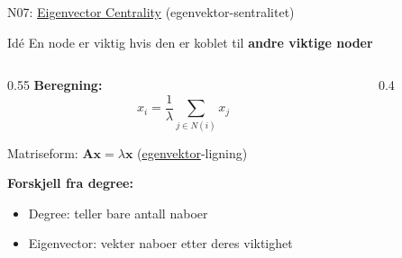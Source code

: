 \documentclass[aspectratio=169, 10pt]{beamer}
\begin{document}
\begin{frame}{N07: \href{https://en.wikipedia.org/wiki/Eigenvector_centrality}{Eigenvector Centrality} (egenvektor-sentralitet)}
    
    \begin{block}{Idé}
        En node er viktig hvis den er koblet til \textbf{andre viktige noder}
    \end{block}
    
    \vspace{2mm}
    
    \begin{columns}
        \begin{column}{0.55\textwidth}
            \textbf{Beregning:}
            \[
            x_i = \frac{1}{\lambda} \sum_{j \in N(i)} x_j
            \]
            
            Matriseform: $\mathbf{Ax} = \lambda \mathbf{x}$ (\href{https://en.wikipedia.org/wiki/Eigenvalues_and_eigenvectors}{egenvektor}-ligning)
            
            \vspace{2mm}
            
            \textbf{Forskjell fra degree:}
            \begin{itemize}
                \item Degree: teller bare antall naboer
                \item Eigenvector: vekter naboer etter deres viktighet
            \end{itemize}
        \end{column}
        
        \begin{column}{0.4\textwidth}
            \begin{center}
            \end{center}
            

\end{column}
\end{columns}
\end{frame}
\end{document}
